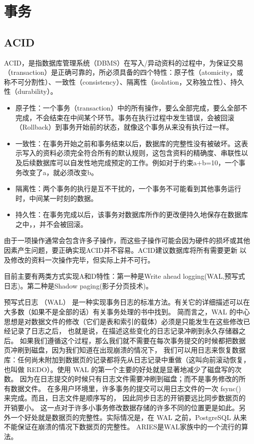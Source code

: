\section{事务}

\subsection{ACID}
ACID，是指数据库管理系统（DBMS）在写入/异动资料的过程中，为保证交易（transaction）是正确可靠的，所必须具备的四个特性：原子性（atomicity，或称不可分割性）、一致性（consistency）、隔离性（isolation，又称独立性）、持久性（durability）。

\begin{itemize}
    \item    原子性：一个事务（transaction）中的所有操作，要么全部完成，要么全部不完成，不会结束在中间某个环节。事务在执行过程中发生错误，会被回滚（Rollback）到事务开始前的状态，就像这个事务从来没有执行过一样。
    \item  一致性：在事务开始之前和事务结束以后，数据库的完整性没有被破坏。这表示写入的资料必须完全符合所有的默认规则，这包含资料的精确度、串联性以及后续数据库可以自发性地完成预定的工作。例如对于约束a+b=10，一个事务改变了a，就必须改变b。
    \item   隔离性：两个事务的执行是互不干扰的，一个事务不可能看到其他事务运行时，中间某一时刻的数据。
    \item   持久性：在事务完成以后，该事务对数据库所作的更改便持久地保存在数据库之中，，并不会被回滚。
\end{itemize}
由于一项操作通常会包含许多子操作，而这些子操作可能会因为硬件的损坏或其他因素产生问题，要正确实现ACID并不容易。ACID建议数据库将所有需要更新 以及修改的资料一次操作完毕，但实际上并不可行。

目前主要有两类方式实现A和D特性：第一种是Write ahead logging(WAL,预写式日志)。第二种是Shadow paging(影子分页技术)。

预写式日志 （WAL） 是一种实现事务日志的标准方法。有关它的详细描述可以在大多数（如果不是全部的话）有关事务处理的书中找到。 简而言之，WAL 的中心思想是对数据文件的修改（它们是表和索引的载体）必须是只能发生在这些修改已经记录了日志之后， 也就是说，在描述这些变化的日志记录冲刷到永久存储器之后。 如果我们遵循这个过程，那么我们就不需要在每次事务提交的时候都把数据页冲刷到磁盘，因为我们知道在出现崩溃的情况下， 我们可以用日志来恢复数据库：任何尚未附加到数据页的记录都将先从日志记录中重做（这叫向前滚动恢复，也叫做 REDO）。使用 WAL 的第一个主要的好处就是显著地减少了磁盘写的次数。 因为在日志提交的时候只有日志文件需要冲刷到磁盘；而不是事务修改的所有数据文件。 在多用户环境里，许多事务的提交可以用日志文件的一次 fsync() 来完成。而且，日志文件是顺序写的， 因此同步日志的开销要远比同步数据页的开销要小。 这一点对于许多小事务修改数据存储的许多不同的位置更是如此。另外一个好处就是数据页的完整性。实际情况是，在 WAL 之前，PostgreSQL 从来不能保证在崩溃的情况下数据页的完整性。
ARIES是WAL家族中的一个流行的算法。


